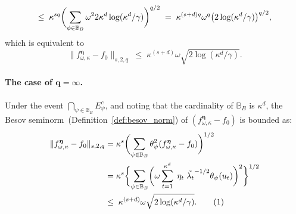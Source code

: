 \documentclass[twoside,11pt]{article}
\newcommand\numberthis{\addtocounter{equation}{1}\tag{\theequation}}
\newcommand{\dimDensity}{d} %
\newcommand{\smoothness}{s}
\newcommand{\ONset}{\mathbb{B}}
\newcommand{\maxErrorTypeOne}{\gamma} %
\newcommand{\binNum}{\kappa}           %
\newcommand{\coef}{\theta}
\newcommand{\besovParamMicroscope}{q}
\begin{document}
\begin{appendix}
\begin{equation*}
		\leq
		\;
		\binNum^{\smoothness \besovParamMicroscope}
		\biggl(
		\sum_{
			\phi
			\in 
			\ONset_{B}
		}
		\omega^2
		2 \binNum^\dimDensity
		\log(\binNum^\dimDensity/\maxErrorTypeOne)
		\biggr)^{\besovParamMicroscope/2}
		\\
		\;
		=
		\;
		\binNum^{(\smoothness + \dimDensity) \besovParamMicroscope}
		\omega^\besovParamMicroscope
		\bigl(
		2\log(\binNum^\dimDensity/\maxErrorTypeOne)
		\bigr)^{\besovParamMicroscope/2},
	\end{equation*}
	which is equivalent to
	\begin{equation*}
		\|f^{{\boldsymbol{\eta}}}_{\omega, \binNum}
		-
		f_0\|_{
			\smoothness,
			2,
			\besovParamMicroscope
		}
		\;
		\leq
		\;
		\binNum^{(\smoothness + \dimDensity)}
		\omega
		\sqrt{
			2\log(\binNum^\dimDensity/\maxErrorTypeOne)
		}.
	\end{equation*}
	\paragraph{The case of $\mathbf{ \besovParamMicroscope = }\boldsymbol{\infty}$.}
	Under the event $\bigcap_{\psi \in \ONset_B} E_{\psi}^c$, and noting that the cardinality of $\ONset_B$ is $\binNum^\dimDensity$,
	the Besov seminorm~(Definition~\ref{def:besov_norm}) of $(
	f^{{\boldsymbol{\eta}}}_{\omega, \binNum}
	-
	f_0
	)$ is bounded as: 
	\begin{align*}
		\|f^{{\boldsymbol{\eta}}}_{\omega, \binNum}
		-
		f_0\|_{
			\smoothness,
			2,
			\besovParamMicroscope
		}
		& =
		\binNum^{\smoothness}
		\biggl(
		\sum_{
			\psi
			\in 
			\ONset_{B}
		}
		\coef^2_{\psi}
		(
		f^{{\boldsymbol{\eta}}}_{\omega, \binNum}
		-
		f_0
		)
		\biggr)^{1/2}
		\\&=
		\binNum^{\smoothness }
		\biggl\{
		\sum_{
			\psi
			\in 
			\ONset_{B}
		}
		\biggl(
		\omega
		\sum_{t=1}^{\binNum^{\dimDensity}}
		\; \eta_t \;\tilde{\lambda_t}^{-1/2}
		\coef_{\psi}(u_t)
		\biggr)^2
		\biggr\}^{1/2}
		\\&\leq
		\;
		\binNum^{(\smoothness + \dimDensity)}
		\omega
		\sqrt{
			2\log(\binNum^\dimDensity/\maxErrorTypeOne)
		}.
		\numberthis
		\label{bound_besov_start_infq}
	\end{align*}

\end{appendix}
\end{document}
